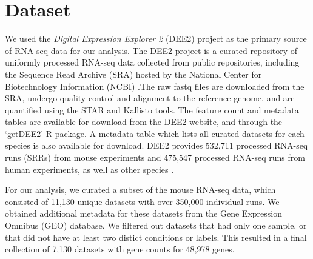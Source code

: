 
\section{Dataset}

We used the \emph{Digital Expression Explorer 2} (DEE2) project as the primary source of
RNA-seq data for our analysis. The DEE2 project is a curated repository of uniformly
processed RNA-seq data collected from public repositories, including the Sequence
Read Archive (SRA) hosted by the National Center for Biotechnology Information (NCBI)
\cite{DEE2}.The raw fastq files are downloaded from the SRA, undergo quality control and
alignment to the reference genome, and are quantified using the STAR and Kallisto tools.
The feature count and metadata tables are available for download from the DEE2 website,
and through the `getDEE2' R package. A metadata table which lists all curated datasets
for each species is also available for download. DEE2 provides 532,711 processed RNA-seq
runs (SRRs) from mouse experiments and 475,547 processed RNA-seq runs from human
experiments, as well as other species \cite{DEE2}.

\vspace{0.2cm}

For our analysis, we curated a subset of the mouse RNA-seq data, which consisted of
11,130 unique datasets with over 350,000 individual runs. We obtained additional
metadata for these datasets from the Gene Expression Omnibus (GEO) database. We
filtered out datasets that had only one sample, or that did not have at least two
distict conditions or labels. This resulted in a final collection of 7,130 datasets
with gene counts for 48,978 genes.
